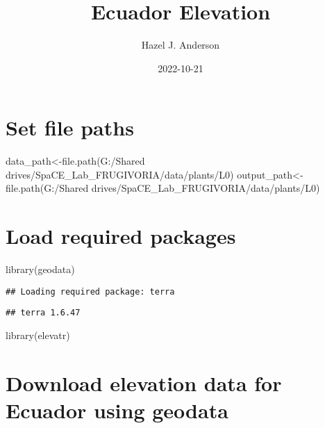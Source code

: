 \documentclass[
]{article}
\title{Ecuador Elevation}
\author{Hazel J. Anderson}
\date{2022-10-21}
\newenvironment{Shaded}{\begin{snugshade}}{\end{snugshade}}
\newcommand{\FunctionTok}[1]{\textcolor[rgb]{0.00,0.00,0.00}{#1}}
\newcommand{\NormalTok}[1]{#1}
\newcommand{\OtherTok}[1]{\textcolor[rgb]{0.56,0.35,0.01}{#1}}
\newcommand{\StringTok}[1]{\textcolor[rgb]{0.31,0.60,0.02}{#1}}
\begin{document}
\maketitle

\hypertarget{set-file-paths}{%
\section{Set file paths}\label{set-file-paths}}

\begin{Shaded}
\begin{Highlighting}[]
\NormalTok{data\_path}\OtherTok{\textless{}{-}}\FunctionTok{file.path}\NormalTok{(}\StringTok{\textquotesingle{}G:/Shared drives/SpaCE\_Lab\_FRUGIVORIA/data/plants/L0\textquotesingle{}}\NormalTok{)}
\NormalTok{output\_path}\OtherTok{\textless{}{-}} \FunctionTok{file.path}\NormalTok{(}\StringTok{\textquotesingle{}G:/Shared drives/SpaCE\_Lab\_FRUGIVORIA/data/plants/L0\textquotesingle{}}\NormalTok{)}
\end{Highlighting}
\end{Shaded}

\hypertarget{load-required-packages}{%
\section{Load required packages}\label{load-required-packages}}

\begin{Shaded}
\begin{Highlighting}[]
\FunctionTok{library}\NormalTok{(geodata)}
\end{Highlighting}
\end{Shaded}

\begin{verbatim}
## Loading required package: terra
\end{verbatim}

\begin{verbatim}
## terra 1.6.47
\end{verbatim}

\begin{Shaded}
\begin{Highlighting}[]
\FunctionTok{library}\NormalTok{(elevatr)}
\end{Highlighting}
\end{Shaded}

\hypertarget{download-elevation-data-for-ecuador-using-geodata}{%
\section{Download elevation data for Ecuador using
geodata}\label{download-elevation-data-for-ecuador-using-geodata}}
\end{document}
